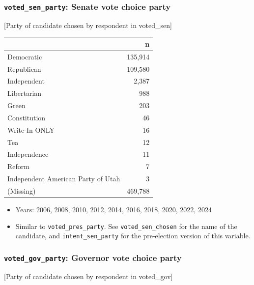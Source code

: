 \documentclass[10pt,article,oneside]{memoir}
\begin{document}
\subsubsection{\texorpdfstring{\texttt{voted\_sen\_party}: Senate vote
choice
party}{voted\_sen\_party: Senate vote choice party}}\label{voted_sen_party-senate-vote-choice-party}

{[}Party of candidate chosen by respondent in voted\_sen{]}

\begin{table}[H]
\centering
\begin{tabular}[t]{lr}
\toprule
 & n\\
\midrule
Democratic & 135,914\\
Republican & 109,580\\
Independent & 2,387\\
Libertarian & 988\\
Green & 203\\
Constitution & 46\\
Write-In ONLY & 16\\
Tea & 12\\
Independence & 11\\
Reform & 7\\
Independent American Party of Utah & 3\\
(Missing) & 469,788\\
\bottomrule
\end{tabular}
\end{table}

\begin{itemize}
\tightlist
\item
  Years: 2006, 2008, 2010, 2012, 2014, 2016, 2018, 2020, 2022, 2024
\item
  Similar to \texttt{voted\_pres\_party}. See
  \texttt{voted\_sen\_chosen} for the name of the candidate, and
  \texttt{intent\_sen\_party} for the pre-election version of this
  variable.
\end{itemize}

\subsubsection{\texorpdfstring{\texttt{voted\_gov\_party}: Governor vote
choice
party}{voted\_gov\_party: Governor vote choice party}}\label{voted_gov_party-governor-vote-choice-party}

{[}Party of candidate chosen by respondent in voted\_gov{]}
\end{document}

